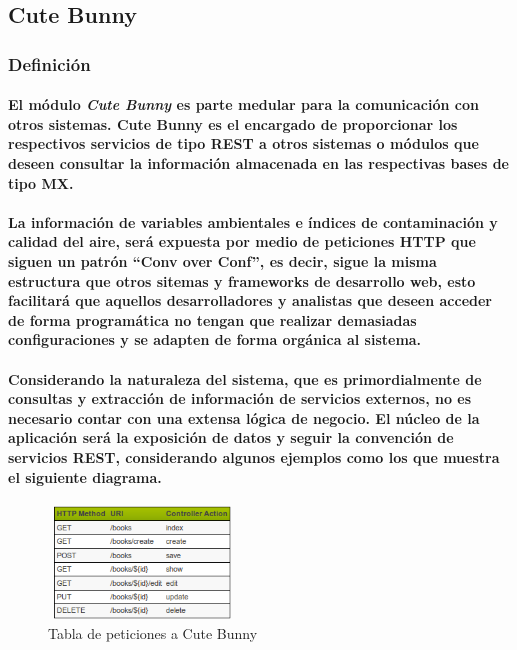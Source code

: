 \subsection{Cute Bunny}
    \subsubsection{Definición}
     \paragraph{El módulo \textbf{\emph{Cute Bunny}} es parte medular para la comunicación con otros sistemas. Cute Bunny es el encargado de proporcionar los respectivos servicios de tipo REST a otros sistemas o módulos que deseen consultar la información almacenada en las respectivas bases de tipo MX.}
     \paragraph{La información de variables ambientales e índices de contaminación y calidad del aire, será expuesta por medio de peticiones HTTP que siguen un patrón ``Conv over Conf'', es decir, sigue la misma estructura que otros sitemas y frameworks de desarrollo web, esto facilitará que aquellos desarrolladores y analistas que deseen acceder de forma programática no tengan que realizar demasiadas configuraciones y se adapten de forma orgánica al sistema.}
     \paragraph{Considerando la naturaleza del sistema, que es primordialmente de consultas y extracción de información de servicios externos, no es necesario contar con una extensa lógica de negocio. El núcleo de la aplicación será la exposición de datos y seguir la convención de servicios REST, considerando algunos ejemplos como los que muestra el siguiente diagrama.}
      \begin{figure}[h!]
        \centering
        \includegraphics[width=5cm,height=3cm]{./images/DiagramaREST.png}
        \caption{Tabla de peticiones a Cute Bunny}
     \end{figure}
